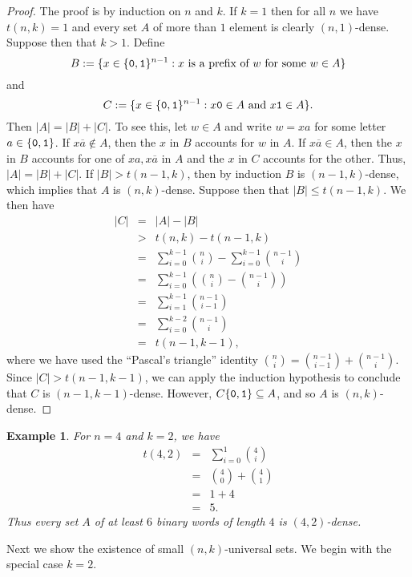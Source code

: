 \documentclass[12pt]{article}
\newtheorem{example}[theorem]{Example}
\begin{document}
\begin{proof}
The proof is by induction on $n$ and $k$.  If $k=1$ then for all $n$
we have $t(n,k) = 1$ and every set $A$ of more than $1$ element is
clearly $(n,1)$-dense.  Suppose then that $k>1$.  Define
\[
B := \{x \in \{{\tt 0,1}\}^{n-1} : x \text{ is a prefix of $w$ for
some } w \in A\}
\]
and
\[
C := \{x \in \{{\tt 0,1}\}^{n-1} : x{\tt 0} \in A \text{ and } x{\tt 1}
\in A\}.
\]
Then $|A| = |B| + |C|$.  To see this, let $w \in A$ and write $w = xa$
for some letter $a \in \{{\tt 0,1}\}$.  If $x\overline{a} \notin A$,
then the $x$ in $B$ accounts for $w$ in $A$.  If $x\overline{a} \in
A$, then the $x$ in $B$ accounts for one of $xa,x\overline{a}$ in $A$
and the $x$ in $C$ accounts for the other.  Thus, $|A| = |B| + |C|$.
If $|B| > t(n-1,k)$, then by induction $B$ is $(n-1,k)$-dense, which
implies that $A$ is $(n,k)$-dense.  Suppose then that $|B| \leq
t(n-1,k)$.  We then have
\begin{eqnarray*}
|C| & = & |A| - |B| \\
& > & t(n,k) - t(n-1,k) \\
& = & \sum_{i = 0}^{k-1} {n \choose i} - \sum_{i = 0}^{k-1} {n-1 \choose
i} \\
& = & \sum_{i = 0}^{k-1} \left( {n \choose i} - {n-1 \choose i}
\right) \\
& = & \sum_{i = 1}^{k-1} {n - 1 \choose i - 1} \\
& = & \sum_{i = 0}^{k-2} {n - 1 \choose i} \\
& = & t(n-1,k-1),
\end{eqnarray*}
where we have used the ``Pascal's triangle'' identity ${n \choose i} =
{n-1 \choose i-1} + {n-1 \choose i}$.  Since $|C| > t(n-1,k-1)$, we
can apply the induction hypothesis to conclude that $C$ is
$(n-1,k-1)$-dense.  However, $C\{{\tt 0,1}\} \subseteq A$, and so $A$
is $(n,k)$-dense.
\end{proof}

\begin{example}
For $n=4$ and $k=2$, we have
\begin{eqnarray*}
t(4,2) & = & \sum_{i=0}^1 {4 \choose i}\\
& = & {4 \choose 0} + {4 \choose 1}\\
& = & 1 + 4\\
& = & 5.
\end{eqnarray*}
Thus every set $A$ of at least $6$ binary words of length $4$ is
$(4,2)$-dense.
\end{example}

Next we show the existence of small $(n,k)$-universal sets.  We begin
with the special case $k=2$.
\end{document}
